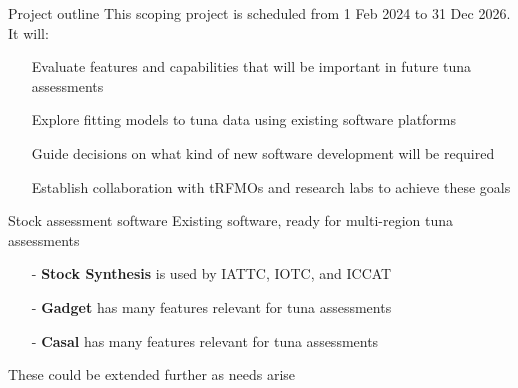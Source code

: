\documentclass[aspectratio=169,fleqn]{beamer}
\begin{document}

\begin{frame}{Project outline}
  This scoping project is scheduled from 1 Feb 2024 to 31 Dec 2026. It
  will:\\[3ex]
  \begin{itemize}
    \item[] Evaluate features and capabilities that will be important in future
    tuna assessments\\[3ex]
    \item[] Explore fitting models to tuna data using existing software
    platforms\\[3ex]
    \item[] Guide decisions on what kind of new software development will be
    required\\[3ex]
    \item[] Establish collaboration with tRFMOs and research labs to achieve these
    goals\\[3ex]
  \end{itemize}
\end{frame}


\begin{frame}{Stock assessment software}
  Existing software, ready for multi-region tuna assessments\\[3ex]
  \begin{itemize}
    \item[-] {\bf Stock Synthesis} is used by IATTC, IOTC, and ICCAT\\[3ex]
    \item[-] {\bf Gadget} has many features relevant for tuna assessments\\[3ex]
    \item[-] {\bf Casal} has many features relevant for tuna assessments\\[4ex]
  \end{itemize}
  These could be extended further as needs arise\\[2ex]
\end{frame}

\end{document}
